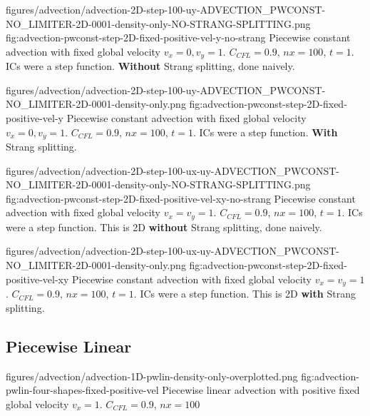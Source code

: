 	
	


\quickfigcap
	{figures/advection/advection-2D-step-100-uy-ADVECTION_PWCONST-NO_LIMITER-2D-0001-density-only-NO-STRANG-SPLITTING.png}
	{fig:advection-pwconst-step-2D-fixed-positive-vel-y-no-strang}
	{
		Piecewise constant advection with fixed global velocity $v_x = 0,  v_y = 1$. 
		$C_{CFL} = 0.9$, $nx = 100$, $t=1$. 
		ICs were a step function.
		\textbf{Without} Strang splitting, done naively.
	}





\quickfigcap
	{figures/advection/advection-2D-step-100-uy-ADVECTION_PWCONST-NO_LIMITER-2D-0001-density-only.png}
	{fig:advection-pwconst-step-2D-fixed-positive-vel-y}
	{
		Piecewise constant advection with fixed global velocity $v_x = 0,  v_y = 1$. 
		$C_{CFL} = 0.9$, $nx = 100$, $t=1$. 
		ICs were a step function.
		\textbf{With} Strang splitting.
	}







\quickfigcap
	{figures/advection/advection-2D-step-100-ux-uy-ADVECTION_PWCONST-NO_LIMITER-2D-0001-density-only-NO-STRANG-SPLITTING.png}
	{fig:advection-pwconst-step-2D-fixed-positive-vel-xy-no-strang}
	{
		Piecewise constant advection with fixed global velocity $v_x = v_y = 1$.
		$C_{CFL} = 0.9$, $nx = 100$, $t=1$. 
		ICs were a step function. 
		This is 2D \textbf{without} Strang splitting, done naively.
	}

\quickfigcap
	{figures/advection/advection-2D-step-100-ux-uy-ADVECTION_PWCONST-NO_LIMITER-2D-0001-density-only.png}
	{fig:advection-pwconst-step-2D-fixed-positive-vel-xy}
	{	
		Piecewise constant advection with fixed global velocity $v_x = v_y = 1$. 
		$C_{CFL} = 0.9$, $nx = 100$, $t=1$. 
		ICs were a step function.
		This is 2D \textbf{with} Strang splitting.
	}








\subsection{Piecewise Linear}






\quickfigcap
	{figures/advection/advection-1D-pwlin-density-only-overplotted.png}
	{fig:advection-pwlin-four-shapes-fixed-positive-vel}
	{
		Piecewise linear advection with positive fixed global velocity $v_x = 1$. 
		$C_{CFL} = 0.9$,  $nx = 100$
	}





